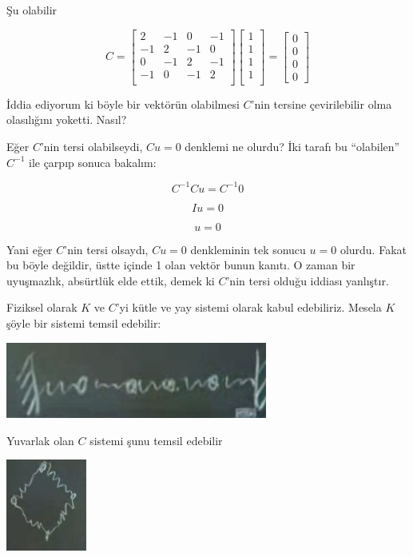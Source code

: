 \documentclass[12pt,fleqn]{article}\usepackage{../../common}
\begin{document}
Şu olabilir

$$ C = 
\left[\begin{array}{rrrr}
2 & -1 & 0 & -1\\
-1 & 2 & -1 & 0\\
0 & -1 & 2 & -1\\
-1 & 0 & -1 & 2\\
\end{array}\right]
\left[\begin{array}{r}
1\\
1\\
1\\
1\\
\end{array}\right]
=
\left[\begin{array}{r}
0\\
0\\
0\\
0
\end{array}\right]
 $$

İddia ediyorum ki böyle bir vektörün olabilmesi $C$'nin tersine çevirilebilir
olma olasılığını yoketti. Nasıl?

Eğer $C$'nin tersi olabilseydi, $Cu = 0$ denklemi ne olurdu? İki tarafı bu
``olabilen'' $C^{-1}$ ile çarpıp sonuca bakalım:

$$ C^{-1}Cu = C^{-1}0 $$

$$ I u = 0 $$

$$ u = 0 $$

Yani eğer $C$'nin tersi olsaydı, $Cu = 0$ denkleminin tek sonucu $u=0$
olurdu. Fakat bu böyle değildir, üstte içinde 1 olan vektör bunun kanıtı. O
zaman bir uyuşmazlık, absürtlük elde ettik, demek ki $C$'nin tersi olduğu
iddiası yanlıştır.

Fiziksel olarak $K$ ve $C$'yi kütle ve yay sistemi olarak kabul
edebiliriz. Mesela $K$ şöyle bir sistemi temsil edebilir:

\includegraphics[height=2.5cm]{1_5.png}

Yuvarlak olan $C$ sistemi şunu temsil edebilir

\includegraphics[height=3cm]{1_6.png}
\end{document}
